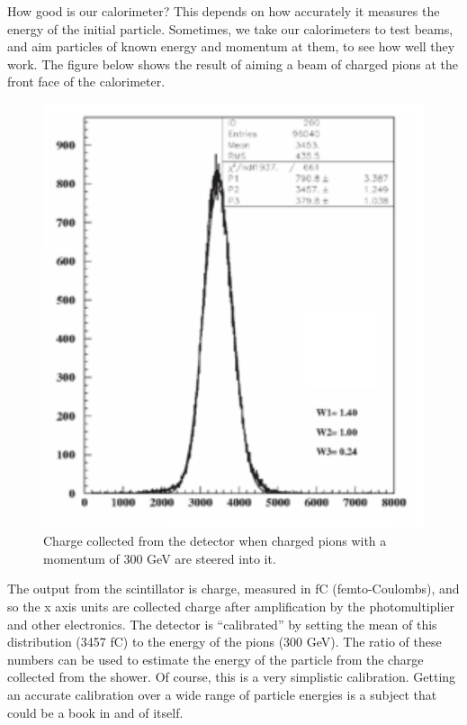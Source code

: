 \noindent
How good is our calorimeter? This depends on how accurately it measures the energy of the initial particle. Sometimes, we take our calorimeters to test beams, and aim particles of known energy and momentum at them, to see how well they work. The figure below shows the result of aiming a beam of charged pions at the front face of the calorimeter.

\;
\;

\begin{figure}[h]
\centering\includegraphics[scale=0.5]{./calorimetry/Pictures/fig7.pdf}
\caption{Charge collected from the detector when charged pions with a momentum of 300 GeV are steered into it.}
\label{fig:cal7}
\end{figure}

\;

\noindent
The output from the scintillator is charge, measured in fC (femto-Coulombs), 
and so the x axis units are collected charge after amplification by the photomultiplier and other electronics. The detector is ``calibrated'' by setting the mean of this distribution (3457 fC) to the energy of the pions (300 GeV). The ratio of these numbers can be used to estimate the energy of the particle from the charge collected from the shower.  Of course, this is a very simplistic calibration. Getting an accurate calibration over a wide range of particle energies is a subject that could be a book in and of itself. 

